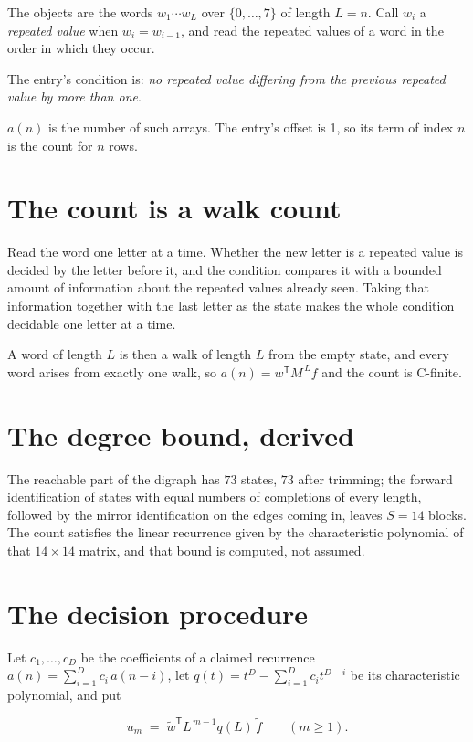 \documentclass[11pt]{article}
\theoremstyle{definition}
\begin{document}
The objects are the words $w_1\cdots w_L$ over $\{0,\dots,7\}$ of length $L = n$. Call $w_i$ a {\itshape repeated value} when $w_i = w_{i-1}$, and read the repeated values of a word in the order in which they occur.

The entry's condition is: {\itshape no repeated value differing from the previous repeated value by more than one}.

$a(n)$ is the number of such arrays. The entry's offset is 1, so its term of index $n$ is the count for $n$ rows.

\section{The count is a walk count}

Read the word one letter at a time. Whether the new letter is a repeated value is decided by the letter before it, and the condition compares it with a bounded amount of information about the repeated values already seen. Taking that information together with the last letter as the state makes the whole condition decidable one letter at a time.

A word of length $L$ is then a walk of length $L$ from the empty state, and every word arises from exactly one walk, so $a(n) = w^{\mathsf T}M^{\,L}f$ and the count is C-finite.

\section{The degree bound, derived}

The reachable part of the digraph has $73$ states, $73$ after trimming; the forward identification of states with equal numbers of completions of every length, followed by the mirror identification on the edges coming in, leaves $S = 14$ blocks. The count satisfies the linear recurrence given by the characteristic polynomial of that $14\times14$ matrix, and that bound is computed, not assumed.

\section{The decision procedure}

Let $c_1,\dots,c_D$ be the coefficients of a claimed recurrence $a(n) = \sum_{i=1}^{D} c_i\,a(n-i)$, let $q(t) = t^{D} - \sum_{i=1}^{D} c_i t^{D-i}$ be its characteristic polynomial, and put

\[u_m \;=\; \tilde w^{\mathsf T} L^{\,m-1} q(L)\,\tilde f \qquad (m \ge 1).\]
\end{document}
